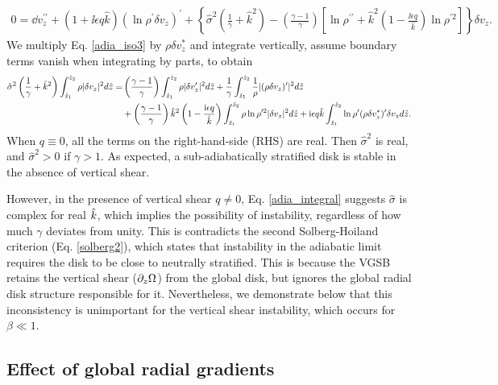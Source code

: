 \begin{align}
  0 =\dd v_z^{\prime\prime} + \left(1 + \ii \epsilon q
    \hat{k}\right)\left(\ln\rho^{\prime}\delta v_z\right)^\prime
  +\left\{\hat{\sigma}^2\left(\frac{1}{\gamma}+\hat{k}^2\right) 
    -\left(\frac{\gamma-1}{\gamma}\right)\left[\ln\rho^{\prime\prime}+\hat{k}^2\left(1-\frac{\ii\epsilon  
          q}{\hat{k}}\right)\ln\rho^{\prime 2}\right]\right\}\delta v_z.\label{adia_iso3}
\end{align}
We multiply Eq. \ref{adia_iso3} by $\rho\delta v_z^*$ and
integrate vertically, assume boundary terms vanish when integrating by
parts, to obtain
\begin{align}
  \hat{\sigma}^2\left(\frac{1}{\gamma} +
    \hat{k}^2\right)\int_{\hat{z}_1}^{\hat{z}_2}\rho|\delta
  v_z|^2 d\hat{z} 
  =&  \left(\frac{\gamma-1}{\gamma}\right)
  \int_{\hat{z}_1}^{\hat{z}_2}\rho|\delta v_z^\prime|^2 d\hat{z}
  +\frac{1}{\gamma}\int_{\hat{z}_1}^{\hat{z}_2}\frac{1}{\rho}|(\rho\delta
  v_z)^\prime|^2 d\hat{z}\notag\\
&+
  \left(\frac{\gamma-1}{\gamma}\right)\hat{k}^2\left(1-\frac{\mathrm{i}\epsilon
      q}{\hat{k}}\right) \int_{\hat{z}_1}^{\hat{z}_2}\rho\ln\rho^{\prime
    2}|\delta v_z|^2 d\hat{z}
+ \mathrm{i}\epsilon q \hat{k}
  \int_{\hat{z}_1}^{\hat{z}_2}\ln\rho^\prime(\rho\delta v_z^*)^\prime
  \delta v_z d\hat{z}.\label{adia_integral}
\end{align}
When $q\equiv0$, all the terms on the right-hand-side (RHS) are real. Then
$\hat{\sigma}^2$ is real, and  $\hat{\sigma}^2>0$ if $\gamma>1$. As
expected, a sub-adiabatically stratified disk is stable in the absence
of vertical shear. 

However, in the presence of vertical shear $q\neq0$,
Eq. \ref{adia_integral} suggests $\hat{\sigma}$ is complex for real
$\hat{k}$, which implies the possibility of instability, regardless of
how much $\gamma$ deviates from unity. This is contradicts the second 
Solberg-Hoiland criterion (Eq. \ref{solberg2}), which states that
instability in the adiabatic limit requires the disk to be close to
neutrally stratified. %
This is because the VGSB retains the vertical shear
($\partial_z\Omega$) from the global disk, but ignores the global radial disk
structure responsible for it. Nevertheless, we demonstrate below that
this inconsistency is unimportant for the vertical shear instability,
which occurs for $\beta\ll1$. 

\subsection{Effect of global radial gradients}


